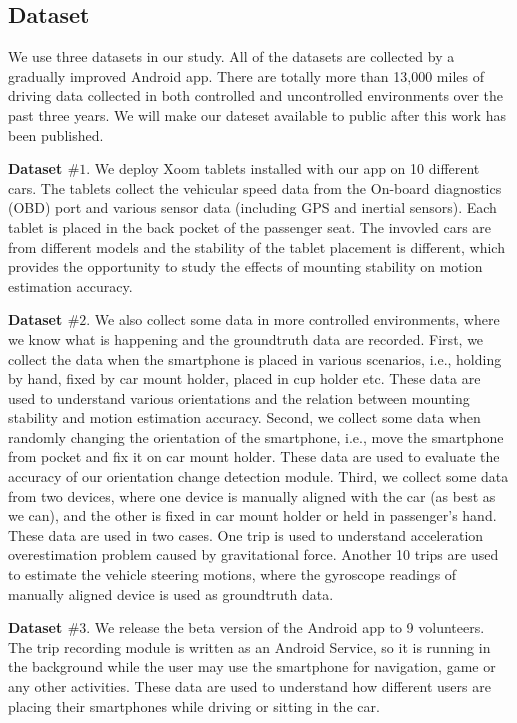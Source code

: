 

\subsection{Dataset}

We use three datasets in our study. 
All of the datasets are collected by a gradually 
improved Android app.  
There are totally more than 13,000 miles of driving data 
collected in both controlled and uncontrolled environments
over the past three years.  
We will make our dateset available to public after 
this work has been published.  


\textbf{Dataset $\#1$}. 
We deploy Xoom tablets installed with our app on 10 different cars. 
The tablets collect the vehicular speed data from the On-board diagnostics (OBD)
port and various sensor data (including GPS and inertial sensors).  
Each tablet is placed in the back pocket of the passenger seat. 
The invovled cars are from different models and the stability
of the tablet placement is different, 
which provides the opportunity to study the effects of 
mounting stability on motion estimation accuracy.   


\textbf{Dataset $\#2$}.
We also collect some data in more controlled environments, 
where we know what is happening and the groundtruth data are recorded. 
First, we collect the data when the smartphone is placed in various scenarios, 
i.e., holding by hand, fixed by car mount holder, placed in cup holder etc. 
These data are used to understand various orientations and 
the relation between mounting stability and motion estimation accuracy.  
Second, we collect some data when randomly changing the 
orientation of the smartphone, i.e., 
move the smartphone from pocket and fix it on car mount holder. 
These data are used to evaluate the accuracy of 
our orientation change detection module. 
Third, we collect some data from two devices, where one device
is manually aligned with the car (as best as we can), 
and the other is fixed in car mount holder or held in passenger's hand. 
These data are used in two cases. 
One trip is used to understand acceleration
overestimation problem caused by gravitational force. 
Another 10 trips are used to estimate the
vehicle steering motions, where the gyroscope readings 
of manually aligned device is used as groundtruth data. 
 

\textbf{Dataset $\#3$}. 
We release the beta version of the Android app 
to 9 volunteers. 
The trip recording module is written as an Android Service,
so it is running in the background while the user may use 
the smartphone for navigation, game or any other activities. 
These data are used to understand how different users
are placing their smartphones while driving or 
sitting in the car. 



